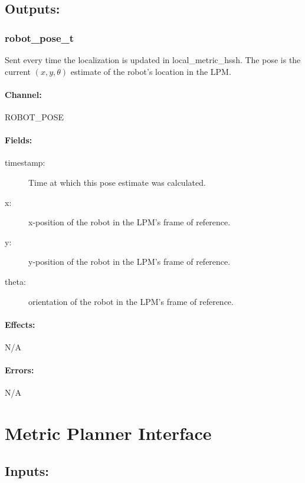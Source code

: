 \documentclass{article}
\begin{document}
\subsection{Outputs:}

\subsubsection{robot\_pose\_t}

Sent every time the localization is updated in local\_metric\_hssh. The pose is the current $(x,y,\theta)$ estimate of 
the robot's location in the LPM.

\paragraph{Channel:} 

ROBOT\_POSE

\paragraph{Fields:}

\begin{description}
    \item[timestamp:] Time at which this pose estimate was calculated.
    \item[x:] x-position of the robot in the LPM's frame of reference.
    \item[y:] y-position of the robot in the LPM's frame of reference.
    \item[theta:] orientation of the robot in the LPM's frame of reference.
\end{description}

\paragraph{Effects:}
N/A

\paragraph{Errors:}
N/A

\section{Metric Planner Interface}

\subsection{Inputs:}
\end{document}
